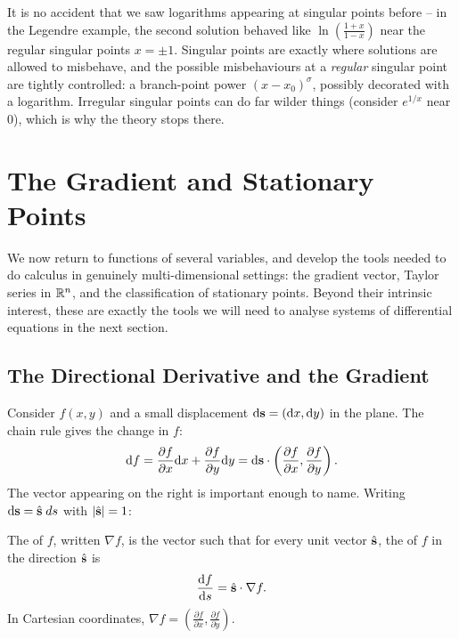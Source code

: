 \documentclass[a4paper]{scrartcl}
\newcommand{\hh}[1]{\hat{\vv{#1}}}
\begin{document}
\begin{remark}
	It is no accident that we saw logarithms appearing at singular points before -- in the Legendre example, the second solution behaved like $\ln\left(\frac{1+x}{1-x}\right)$ near the regular singular points $x = \pm 1$. Singular points are exactly where solutions are allowed to misbehave, and the possible misbehaviours at a \emph{regular} singular point are tightly controlled: a branch-point power $(x - x_0)^\sigma$, possibly decorated with a logarithm. Irregular singular points can do far wilder things (consider $e^{1/x}$ near $0$), which is why the theory stops there.
\end{remark}

\section{The Gradient and Stationary Points}

We now return to functions of several variables, and develop the tools needed to do calculus in genuinely multi-dimensional settings: the gradient vector, Taylor series in $\mathbb{R}^n$, and the classification of stationary points. Beyond their intrinsic interest, these are exactly the tools we will need to analyse systems of differential equations in the next section.

\subsection{The Directional Derivative and the Gradient}

Consider $f(x, y)$ and a small displacement $\mathrm{d}\mathbf{s} = (\mathrm{d}x, \mathrm{d}y)$ in the plane. The chain rule gives the change in $f$:
$$
\mathrm{d}f = \frac{\partial f}{\partial x}\mathrm{d}x + \frac{\partial f}{\partial y}\mathrm{d}y = \mathrm{d}\mathbf{s} \cdot \left(\frac{\partial f}{\partial x}, \frac{\partial f}{\partial y}\right).
$$
The vector appearing on the right is important enough to name. Writing $\mathrm{d}\vv s = \hh s \dd s$ with $|\hh s| = 1$:

\begin{definition}
	The  of $f$, written $\nabla f$, is the vector such that for every unit vector $\hh s$, the  of $f$ in the direction $\hh s$ is
	$$
	\frac{\mathrm{d}f}{\mathrm{d}s} = \hh{s} \cdot \nabla f.
	$$
	In Cartesian coordinates, $\nabla f = \left(\frac{\partial f}{\partial x}, \frac{\partial f}{\partial y}\right)$.
\end{definition}
\end{document}
